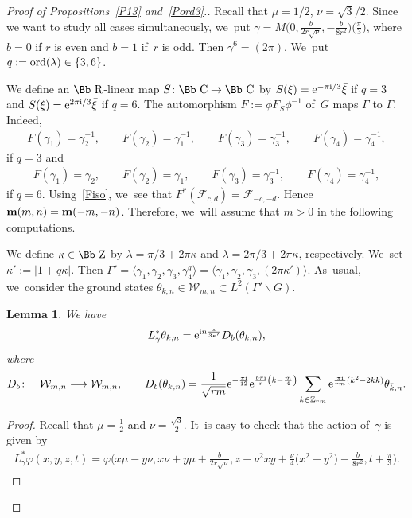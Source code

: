 \documentclass[pdftex]{sigma}
\newcommand\CC{{\mbox{\Bb C}}}
\newcommand\RR{{\mbox{\Bb R}}}
\newcommand\ZZ{{\mbox{\Bb Z}}}
\newcommand\Z{{\mathbb Z}}
\newcommand\bm{\textbf{{\rm \textbf{m}}}}
\newcommand\cW{{\mathcal W}}
\newcommand\cF{{\mathcal F}}
\newcommand\ph{\varphi}
\newcommand{\ord}{{\rm ord}}
\newcommand\la{\langle}
\newcommand\ra{\rangle}
\numberwithin{equation}{section}
\newtheorem{Lemma}[Theorem]{Lemma}
\begin{document}
\begin{proof}[Proof of Propositions~\ref{P13} and~\ref{Pord3}.] Recall that $\mu=1/2$, $\nu=\sqrt 3/2$.
Since we want to study all cases simultaneously, we~put $\gamma= M\big(0,\frac{b}{2r\sqrt\nu},-\frac{b}{8r^2}\big)\big(\frac{\pi}{3}\big)$,
where $b=0$ if $r$ is even and $b=1$ if~$r$ is odd.
Then $\gamma^6=(2\pi)$. We~put $q:=\ord(\lambda)\in\{3,6\}$.

We define an $\RR$-linear map $S\colon \CC\to\CC$ by $S(\xi)={\rm e}^{-\pi {\rm i}/3}\bar \xi$ if $q=3$ and $S(\xi)={\rm e}^{2\pi {\rm i}/3}\bar\xi$ if $q=6$. The automorphism $F:=\phi F_S\phi^{-1}$ of~$G$ maps $\Gamma$ to $\Gamma$. Indeed,
\begin{gather*}
F(\gamma_1)=\gamma_2^{-1},\qquad F(\gamma_2)=\gamma_1^{-1},\qquad F(\gamma_3)=\gamma_3^{-1},\qquad F(\gamma_4)=\gamma_4^{-1},
\end{gather*}
if $q=3$ and
\begin{gather*}
F(\gamma_1)=\gamma_2,\qquad F(\gamma_2)=\gamma_1,\qquad F(\gamma_3)=\gamma_3^{-1},\qquad F(\gamma_4)=\gamma_4^{-1},
\end{gather*}
if $q=6$.
Using~\eqref{Fiso}, we~see that $F^*(\cF_{c,d})=\cF_{-c,-d}$. Hence $\bm(m,n)=\bm(-m,-n)$. Therefore, we~will assume that $m>0$ in the following computations.

We define $\kappa\in\ZZ$ by $\lambda=\pi/3+2\pi\kappa$ and $\lambda=2\pi/3+2\pi\kappa$, respectively. We~set $\kappa':=|1+q\kappa|$. Then $\Gamma'=\la \gamma_1,\gamma_2,\gamma_3,\gamma_4^q\ra=\la \gamma_1,\gamma_2,\gamma_3,(2\pi\kappa')\ra$. As~usual, we~consider the ground states $\theta_{k,n} \in \cW_{m,n}\subset L^2(\Gamma'\backslash G)$.
\begin{Lemma}
We have
\begin{gather*}
L^*_{\gamma} \theta_{k,n} = {\rm e}^{{\rm i}n\frac{\pi}{3\kappa'}} D_b(\theta_{k,n}),
\end{gather*}
where
\begin{gather*}
D_b\colon\quad {\mathcal W}_{m,n}\longrightarrow {\mathcal W}_{m,n}, \qquad D_b(\theta_{k,n})=\frac1{\sqrt{rm}} {\rm e}^{-\frac {\pi {\rm i}}{12}}{\rm e}^{\frac{b\pi {\rm i}}r\left(k-\frac m4\right)}\sum_{\bar k\in \Z_{rm}} {\rm e}^{\frac{\pi {\rm i}}{rm} (k^2-2k\bar k) }\theta_{\bar k,n}.
\end{gather*}
\end{Lemma}

\begin{proof}
Recall that $\mu=\frac{1}{2}$ and $\nu=\frac{\sqrt{3}}{2}$. It~is easy to check that the action of~$\gamma$ is given by
\begin{gather}\label{Ew3}
L^*_{\gamma} \ph(x,y,z,t)=\ph\bigg(\!x \mu -y \nu, x \nu + y\mu+\frac b{2r{\sqrt\nu}}, z -\nu^2 {xy} +\frac\nu4 \big(x^2\!-y^2\big)\!-\frac b{8r^2},t+\frac{\pi}{3}\bigg).
\end{gather}


\end{proof}
\end{proof}
\end{document}
